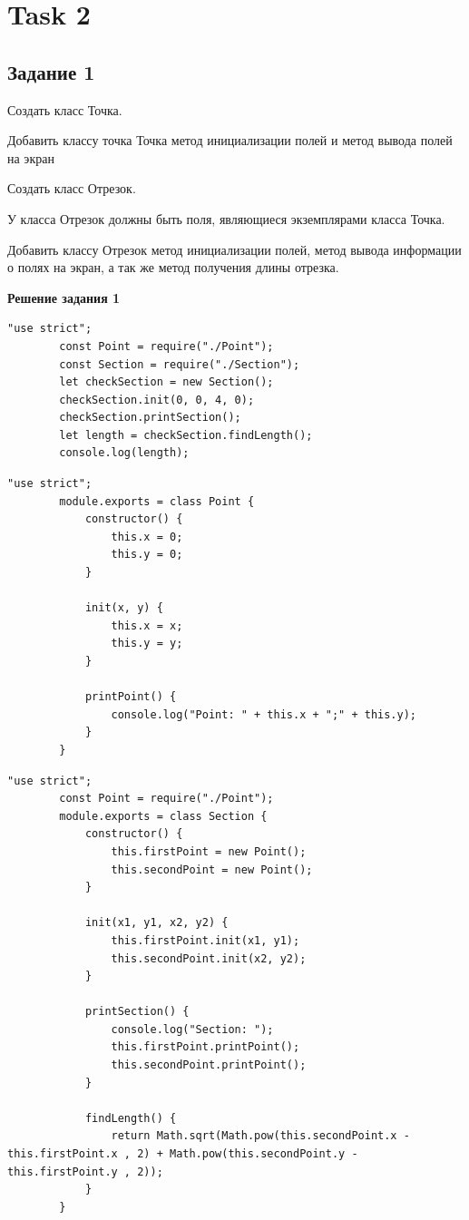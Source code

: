 \documentclass[12pt]{report}
\begin{document}
	\chapter{Task 2}
	\section{Задание 1}
	\noindent Создать класс Точка.\par
	\noindent Добавить классу точка Точка метод инициализации полей и метод вывода полей на экран\par
	\noindent Создать класс Отрезок.\par
	\noindent У класса Отрезок должны быть поля, являющиеся экземплярами класса Точка.\par
	\noindent Добавить классу Отрезок метод инициализации полей, метод вывода информации о полях на экран, а так же метод получения длины отрезка.\par
	\noindent\textbf{Решение задания 1}
	\begin{lstlisting}[label=Task2.1,caption=Файл index.js]
		"use strict";
		const Point = require("./Point");
		const Section = require("./Section");
		let checkSection = new Section();
		checkSection.init(0, 0, 4, 0);
		checkSection.printSection();
		let length = checkSection.findLength();
		console.log(length);
	\end{lstlisting}
	\begin{lstlisting}[label=Task2.1,caption=Файл Point.js]
		"use strict";
		module.exports = class Point {
			constructor() {
				this.x = 0;
				this.y = 0;
			}
			
			init(x, y) {
				this.x = x;
				this.y = y;
			}
			
			printPoint() {
				console.log("Point: " + this.x + ";" + this.y);
			}
		}
	\end{lstlisting}
	\begin{lstlisting}[label=Task2.1,caption=Файл Section.js]
		"use strict";
		const Point = require("./Point");
		module.exports = class Section {
			constructor() {
				this.firstPoint = new Point();
				this.secondPoint = new Point();
			}
			
			init(x1, y1, x2, y2) {
				this.firstPoint.init(x1, y1);
				this.secondPoint.init(x2, y2);
			}
			
			printSection() {
				console.log("Section: ");
				this.firstPoint.printPoint();
				this.secondPoint.printPoint();
			}
			
			findLength() {
				return Math.sqrt(Math.pow(this.secondPoint.x - this.firstPoint.x , 2) + Math.pow(this.secondPoint.y - this.firstPoint.y , 2));
			}
		}
	\end{lstlisting}
	
\end{document}
